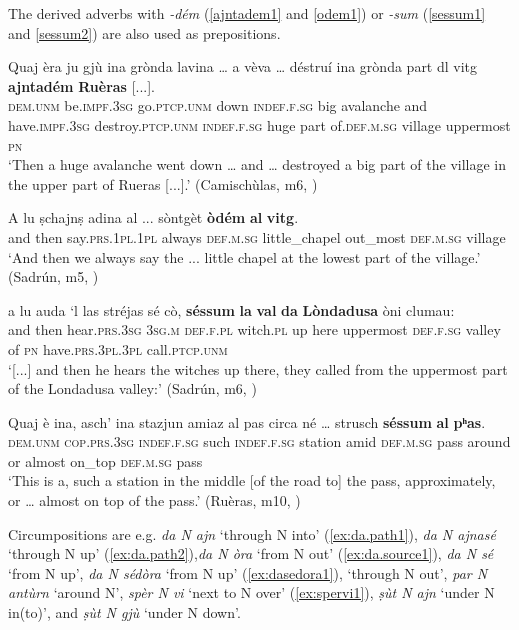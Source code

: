 The derived adverbs with {\textit{-dém}} (\ref{ajntadem1}  and \ref{odem1}) or \textit{-sum} (\ref{sessum1} and \ref{sessum2}) are also used as prepositions.

\ea
\label{ajntadem1}
\gll    Quaj èra ju gjù ina grònda lavina … a vèva … déstruí ina grònda part dl vitg \textbf{ajntadém} \textbf{Ruèras} [...].\\
\textsc{dem.unm} be.\textsc{impf.3sg} go.\textsc{ptcp.unm} down \textsc{indef.f.sg} big avalanche {} and have.\textsc{impf.3sg} {} destroy.\textsc{ptcp.unm} \textsc{indef.f.sg} huge part of.\textsc{def.m.sg} village uppermost \textsc{pn}\\
\glt `Then a huge avalanche went down … and  … destroyed a big part of the village in the upper part of Rueras [...].' (Camischùlas, m6, )
\z

\ea
\label{odem1}
\gll A lu ṣchajnṣ adina al ... sòntgèt \textbf{òdém} \textbf{al} \textbf{vitg}.\\
and then say.\textsc{prs.1pl.1pl} always \textsc{def.m.sg} {} little\_chapel out\_most \textsc{def.m.sg} village\\
\glt `And then we always say the ... little chapel at the lowest part of the village.' (Sadrún, m5, )
\z

\ea
\label{sessum1}
\gll    [...] a lu auda `l las stréjas sé cò, \textbf{séssum} \textbf{la} \textbf{val} \textbf{da} \textbf{Lòndadusa} òni clumau:\\
{} and then hear.\textsc{prs.3sg} \textsc{3sg.m} \textsc{def.f.pl} witch.\textsc{pl} up here uppermost \textsc{def.f.sg} valley of \textsc{pn} have.\textsc{prs.3pl.3pl} call.\textsc{ptcp.unm}\\
\glt `[...] and then he hears the witches up there, they called from the uppermost part of the Londadusa valley:' (Sadrún, m6, )
\z

\ea
\label{sessum2}
\gll Quaj è ina, asch’ ina stazjun amiaz al pas circa né … strusch \textbf{séssum} \textbf{al} \textbf{pʰas}.   \\
\textsc{dem.unm} \textsc{cop.prs.3sg} \textsc{indef.f.sg} such \textsc{indef.f.sg} station amid \textsc{def.m.sg} pass around or {} almost on\_top \textsc{def.m.sg} pass\\
\glt `This is a, such a station in the middle [of the road to] the pass, approximately, or … almost on top of the pass.' (Ruèras, m10, )
\z

Circumpositions are e.g. \textit{da {N} ajn} `through N into' (\ref{ex:da.path1}), \textit{da {N} ajnasé} `through N up' (\ref{ex:da.path2}),\textit{da {N} òra} `from N out' (\ref{ex:da.source1}), \textit{da {N} sé} `from N up', \textit{da {N} sédòra} `from N up' (\ref{ex:dasedora1}),  `through N out', \textit{par {N} antùrn} `around N', \textit{spèr {N} vi} `next to N over' (\ref{ex:spervi1}), \textit{ṣùt {N} ajn} `under N in(to)', and \textit{ṣùt \textsc{N} gjù} `under N down'.

